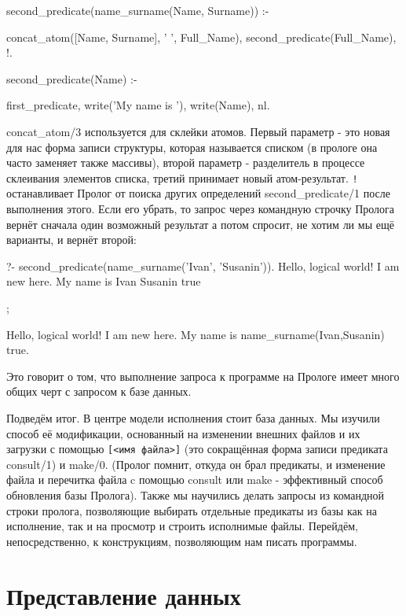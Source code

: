 \documentclass[a4paper]{book}
\begin{document}
\begin{example}{}{}
second_predicate(name_surname(Name, Surname)) :-

   concat_atom([Name, Surname], ' ', Full_Name),
   second_predicate(Full_Name), !.

second_predicate(Name) :-

  first_predicate,
  write('My name is '), write(Name), nl.

\end{example}

concat_atom/3 используется для склейки атомов. Первый параметр -
это новая для нас форма записи структуры, которая называется
списком (в прологе она часто заменяет также массивы), второй
параметр - разделитель в процессе склеивания элементов списка,
третий принимает новый атом-результат. \verb|!| останавливает
Пролог от поиска других определений second_predicate/1 после
выполнения этого. Если его убрать, то запрос через командную
строчку Пролога вернёт сначала один возможный результат а потом
спросит, не хотим ли мы ещё варианты, и вернёт второй:

\begin{example}{}{}
?- second_predicate(name_surname('Ivan', 'Susanin')).
Hello, logical world!
I am new here.
My name is Ivan Susanin
true 


; %

Hello, logical world!
I am new here.
My name is name_surname(Ivan,Susanin)
true.
\end{example}

Это говорит о том, что выполнение запроса к программе на Прологе
имеет много общих черт с запросом к базе данных.

Подведём итог. В центре модели исполнения стоит база данных. Мы
изучили способ её модификации, основанный на изменении внешних
файлов и их загрузки с помощью \verb|[<имя файла>]| (это
сокращённая форма записи предиката consult/1) и make/0. (Пролог
помнит, откуда он брал предикаты, и изменение файла и перечитка
файла c помощью consult или make - эффективный способ обновления
базы Пролога). Также мы научились делать запросы из командной
строки пролога, позволяющие выбирать отдельные предикаты из базы
как на исполнение, так и на просмотр и строить исполнимые
файлы. Перейдём, непосредственно, к конструкциям, позволяющим нам
писать программы.

\section{Представление данных}
\end{document}
